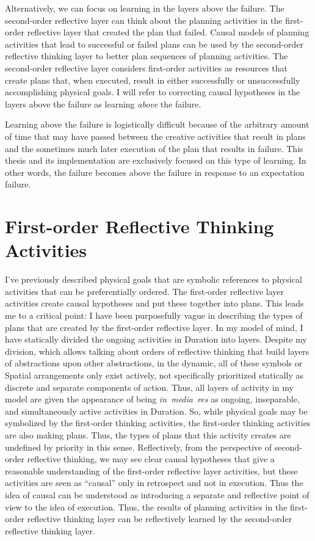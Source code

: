 Alternatively, we can focus on learning in the layers above the
failure.  The second-order reflective layer can think about the
planning activities in the first-order reflective layer that created
the plan that failed.  Causal models of planning activities that lead
to successful or failed plans can be used by the second-order
reflective thinking layer to better plan sequences of planning
activities.  The second-order reflective layer considers first-order
activities as resources that create plans that, when executed, result
in either successfully or unsuccessfully accomplishing physical goals.
I will refer to correcting causal hypotheses in the layers above the
failure as learning \emph{above} the failure.

Learning above the failure is logistically difficult because of the
arbitrary amount of time that may have passed between the creative
activities that result in plans and the sometimes much later execution
of the plan that results in failure.  This thesis and its
implementation are exclusively focused on this type of learning.  In
other words, the failure becomes above the failure in response to an
expectation failure.

\section{First-order Reflective Thinking Activities}

I've previously described physical goals that are symbolic references
to physical activities that can be preferentially ordered.  The
first-order reflective layer activities create causal hypotheses and
put these together into plans.  This leads me to a critical point: I
have been purposefully vague in describing the types of plans that are
created by the first-order reflective layer.  In my model of mind, I
have statically divided the ongoing activities in Duration into
layers.  Despite my division, which allows talking about orders of
reflective thinking that build layers of abstractions upon other
abstractions, in the dynamic, all of these symbols or Spatial
arrangements only exist actively, not specifically prioritized
statically as discrete and separate components of action.  Thus, all
layers of activity in my model are given the appearance of being
\emph{in~media~res} as ongoing, inseparable, and simultaneously active
activities in Duration.  So, while physical goals may be symbolized by
the first-order thinking activities, the first-order thinking
activities are also making plans.  Thus, the types of plans that this
activity creates are undefined by priority in this sense.
Reflectively, from the perspective of second-order reflective
thinking, we may see clear causal hypotheses that give a reasonable
understanding of the first-order reflective layer activities, but
these activities are seen as ``causal'' only in retrospect and not in
execution.  Thus the idea of causal can be understood as introducing a
separate and reflective point of view to the idea of execution.  Thus,
the results of planning activities in the first-order reflective
thinking layer can be reflectively learned by the second-order
reflective thinking layer.

